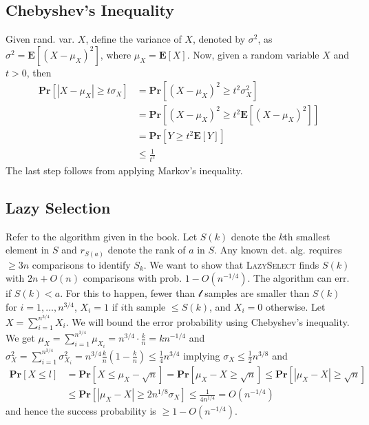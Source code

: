 \documentclass[12pt]{article}
\begin{document}
\subsection*{Chebyshev's Inequality}
Given rand. var. $X$, define the variance of $X$, denoted by $\sigma^2$, as $\sigma^2 = \mathbf{E}\left[ \left( X - \mu_X \right)^2 \right]$, where $\mu_X = \mathbf{E} \left[ X \right]$. Now, given a random variable $X$ and $t > 0$, then
\begin{align*}
\mathbf{Pr}\left[ \left| X-\mu_X \right| \geq t\sigma_X \right] &= \mathbf{Pr}\left[ \left( X-\mu_X \right)^2 \geq t^2\sigma_X^2 \right] \\
&= \mathbf{Pr}\left[ \left( X-\mu_X \right)^2 \geq t^2 \mathbf{E}\left[\left( X-\mu_X \right)^2\right] \right] \\
&= \mathbf{Pr}\left[ Y \geq t^2\mathbf{E}\left[Y\right] \right] \\
&\leq \frac{1}{t^2}
\end{align*}
The last step follows from applying Markov's inequality.

\subsection*{Lazy Selection}
Refer to the algorithm given in the book. Let $S(k)$ denote the $k$th smallest element in $S$ and $r_{S(a)}$ denote the rank of $a$ in $S$. Any known det. alg. requires $\geq 3n$ comparisons to identify $S_{k}$. We want to show that \textsc{LazySelect} finds $S(k)$ with $2n + O(n)$ comparisons with prob. $1-O(n^{-1/4})$. The algorithm can err. if $S(k) < a$. For this to happen, fewer than $\mathcal{l}$ samples are smaller than $S(k)$ for $i=1, \hdots, n^{3/4}$, $X_i=1$ if $i$th sample $\leq S(k)$, and $X_i = 0$ otherwise. Let $X=\sum^{n^{3/4}}_{i=1} X_i$. We will bound the error probability using Chebyshev's inequality. We get $\mu_X = \sum^{n^{3/4}}_{i=1} \mu_{X_i} = n^{3/4}\cdot \frac{k}{n}=kn^{-1/4}$ and $\sigma_X^2 = \sum^{n^{3/4}}_{i=1} \sigma^2_{X_i} = n^{3/4}\frac{k}{n}\left( 1-\frac{k}{n} \right) \leq \frac{1}{4}n^{3/4}$ implying $\sigma_X \leq \frac{1}{2}n^{3/8}$ and
\begin{align*}
\mathbf{Pr} \left[ X \leq l \right] &= \mathbf{Pr} \left[ X \leq \mu_X - \sqrt{n} \right] = \mathbf{Pr} \left[ \mu_X - X \geq \sqrt{n} \right] \leq \mathbf{Pr} \left[ \left| \mu_X - X \right| \geq \sqrt{n} \right] \\
&\leq \mathbf{Pr} \left[ \left| \mu_X - X \right| \geq 2n^{1/8}\sigma_X \right] \leq \frac{1}{4n^{1/4}} = O(n^{-1/4})
\end{align*}
and hence the success probability is $\geq 1-O(n^{-1/4})$.
\end{document}

